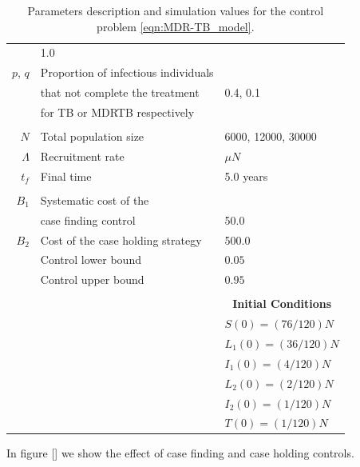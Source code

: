 \begin{table}
\begin{tabular}{rll}
			& \num{1.0}
     	    \\
     	    $p$, $q$
     	    & Proportion of infectious individuals 
     	    \\
     	    & that not complete the treatment  
     	    & \num{0.4}, \num{0.1}
     	    \\
     	    & for TB or MDRTB respectively
		\\
		\\	
			$N$ 
			& Total population size
			& 
			\num{6000}, 
			\num{12000}, 
			\num{30000}
            \\
			$\Lambda$ 
				& Recruitment rate
				& $\mu N$
            \\
            $t_f$ 
            & Final time 
            & \num{5.0} years
      \\
      \\
     	    $B_1$ 
     	    & Systematic cost of the 
     	    \\
     	    & case finding  control
     	    & \num{50.0}
			\\
     	    $B_2$
     	    & 
     	    Cost of the case holding strategy
     	    & \num{500.0}
     	    \\
     	    & Control lower bound  & $0.05$
			\\
            & Control upper bound & $0.95$
       		\\
       		\\
		&&\multicolumn{1}{c}{\textbf{Initial Conditions}}
		\\
		\cmidrule{3-3}
		&&	
		$S(0) = (76/120)N$
		\\
		&&
		$L_1(0) = (36/120) N$
		\\
		&&
		$I_1(0) = (4/120)N$
		\\
		&&
		$L_2(0) =(2/120) N$
		\\
		&&
		$I_2(0) = (1/120)N$
		\\
		&&
		$T(0)= (1/120)N$
		\\
		\bottomrule
    \end{tabular}
	\caption{Parameters description and simulation values for the control 
	problem \eqref{eqn:MDR-TB_model}.}
\end{table}









In figure [] we show the effect of case finding and case holding controls.

